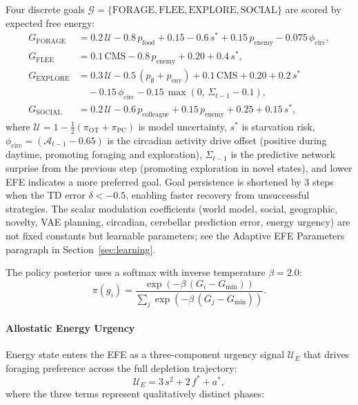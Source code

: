 \documentclass[12pt]{article}
\begin{document}
Four discrete goals $\mathcal{G} = \{\text{FORAGE}, \text{FLEE},
\text{EXPLORE}, \text{SOCIAL}\}$ are scored by expected free energy:
\begin{equation}\label{eq:efe}
\begin{aligned}
  G_\text{FORAGE} &= 0.2\,\mathcal{U} - 0.8\,p_\text{food} + 0.15
    - 0.6\,s^* + 0.15\,p_\text{enemy} - 0.075\,\phi_\text{circ}, \\
  G_\text{FLEE} &= 0.1\,\text{CMS} - 0.8\,p_\text{enemy}
    + 0.20 + 0.4\,s^*, \\
  G_\text{EXPLORE} &= 0.3\,\mathcal{U} - 0.5\,(p_\emptyset + p_\text{env})
    + 0.1\,\text{CMS} + 0.20 + 0.2\,s^* \\
    &\quad - 0.15\,\phi_\text{circ}
    - 0.15\,\max(0,\,\Sigma_{t-1} - 0.1), \\
  G_\text{SOCIAL} &= 0.2\,\mathcal{U} - 0.6\,p_\text{colleague}
    + 0.15\,p_\text{enemy} + 0.25 + 0.15\,s^*,
\end{aligned}
\end{equation}
where $\mathcal{U} = 1 - \frac{1}{2}(\pi_\text{OT} + \pi_\text{PC})$
is model uncertainty, $s^*$ is starvation risk,
$\phi_\text{circ} = (\mathcal{A}_{t-1} - 0.65)$ is the circadian
activity drive offset (positive during daytime, promoting foraging
and exploration), $\Sigma_{t-1}$ is the predictive network surprise
from the previous step (promoting exploration in novel states),
and lower EFE indicates a more preferred goal.
Goal persistence is shortened by 3 steps when the TD error
$\delta < -0.5$, enabling faster recovery from unsuccessful strategies.
The scalar modulation coefficients (world model, social, geographic, novelty,
VAE planning, circadian, cerebellar prediction error, energy urgency) are
not fixed constants but learnable parameters; see the Adaptive EFE
Parameters paragraph in Section~\ref{sec:learning}.

The policy posterior uses a softmax with inverse temperature
$\beta = 2.0$:
\begin{equation}\label{eq:posterior}
  \pi(g_i) = \frac{\exp(-\beta\,(G_i - G_\text{min}))}
                   {\sum_j \exp(-\beta\,(G_j - G_\text{min}))}.
\end{equation}

\paragraph{Allostatic Energy Urgency}

Energy state enters the EFE as a three-component urgency signal
$\mathcal{U}_E$ that drives foraging preference across the full
depletion trajectory:
\begin{equation}\label{eq:energy_urgency}
  \mathcal{U}_E = 3\,s^2 + 2\,f^* + a^*,
\end{equation}
where the three terms represent qualitatively distinct phases:
\end{document}

